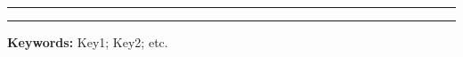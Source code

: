 \begin{comment}
\selectlanguage{french}
\begin{Abstract}
 \rule{\linewidth}{.7pt}
 aaaa.
 \rule{\linewidth}{.7pt}
 {\bf Mots cl\'es :} 111 ; 222 ; 333 ; *** ; *** ; ***.
\end{Abstract}
\end{comment}

\begin{Abstract}
 \rule{\linewidth}{.7pt}

  \MyPara

 \noindent\rule{\linewidth}{.7pt}
 {\bf Keywords:} Key1; Key2; etc.
\end{Abstract}
